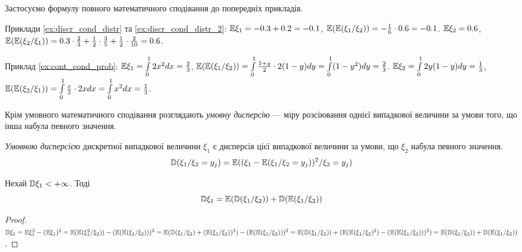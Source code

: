 \begin{example}
    Застосуємо формулу повного математичного сподівання до попередніх прикладів.

    \noindent Приклади \ref{ex:discr_cond_distr} та \ref{ex:discr_cond_distr_2}:
        $\mathbb{E}\xi_1 = -0.3 + 0.2 = -0.1$, $\mathbb{E}(\mathbb{E}(\xi_1 / \xi_2)) = -\frac{1}{6}
        \cdot0.6 = -0.1$.
        $\mathbb{E}\xi_2 = 0.6$, $\mathbb{E}(\mathbb{E}(\xi_2 / \xi_1)) = 0.3\cdot\frac{2}{3} + 
        \frac{1}{2}\cdot\frac{3}{5} + \frac{1}{2} \cdot\frac{2}{10} = 
        0.6$.

    \noindent Приклад \ref{ex:cont_cond_prob}:
        $\mathbb{E}\xi_1 = \int\limits_0^1 2x^2 dx = \frac{2}{3}$, $\mathbb{E}(\mathbb{E}(\xi_1 / \xi_2)) = \int\limits_0^1 \frac{1+y}{2} \cdot 2(1-y) dy = \int\limits_0^1 (1-y^2) dy = \frac{2}{3}$.
        $\mathbb{E}\xi_2 = \int\limits_0^1 2y(1-y) dy = \frac{1}{3}$, $\mathbb{E}(\mathbb{E}(\xi_2 / \xi_1)) = \int\limits_0^1 \frac{x}{2} \cdot 2x dx = \int\limits_0^1 x^2 dx = \frac{1}{3}$. 
\end{example}


Крім умовного математичного сподівання розглядають
\emph{умовну дисперсію} --- міру розсіювання однієї випадкової величини 
за умови того, що інша набула певного значення.

\begin{definition}
    \emph{Умовною дисперсією} дискретної випадкової величини $\xi_1$ 
    є дисперсія цієї випадкової величини за умови, що 
    $\xi_2$ набула певного значення.
    $$\mathbb{D}(\xi_1 / \xi_2 = y_j) = 
    \mathbb{E}((\xi_1 - \mathbb{E}(\xi_1 / \xi_2 = y_j))^2/\xi_2 = y_j)$$
\end{definition}

\begin{proposition*}
    Нехай $\mathbb{D}\xi_1 < +\infty$. Тоді
    \begin{equation}
        \mathbb{D}\xi_1 = \mathbb{E}(\mathbb{D}(\xi_1/\xi_2)) + \mathbb{D}(\mathbb{E}(\xi_1 / \xi_2))
    \end{equation}
\end{proposition*}

\begin{proof}
    $\mathbb{D}\xi_1 = \mathbb{E}\xi_1^2 - (\mathbb{E} \xi_1)^2 = 
    \mathbb{E}(\mathbb{E}(\xi_1^2 / \xi_2)) - (\mathbb{E}(\mathbb{E}(\xi_1/\xi_2)))^2 = 
    \mathbb{E}(\mathbb{D}(\xi_1/\xi_2) + (\mathbb{E}(\xi_1/\xi_2))^2) - (\mathbb{E}(\mathbb{E}(\xi_1/\xi_2)))^2 = 
    \mathbb{E}(\mathbb{D}(\xi_1 / \xi_2)) + (\mathbb{E}(\mathbb{E}(\xi_1/\xi_2)^2) - 
    (\mathbb{E}(\mathbb{E}(\xi_1 / \xi_2)))^2) = \mathbb{E}(\mathbb{D}(\xi_1/\xi_2)) + \mathbb{D}(\mathbb{E}(\xi_1/\xi_2))$.
\end{proof}



